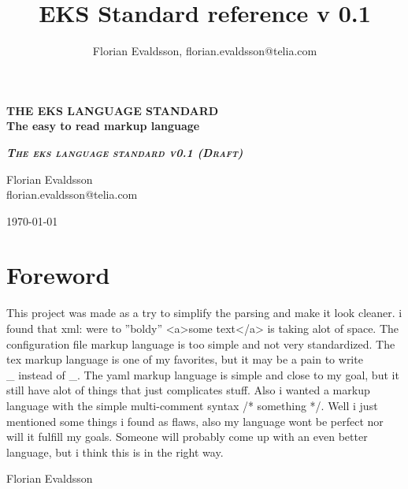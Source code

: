 \documentclass{book}
\title{\textbf{EKS Standard reference v 0.1}}
\author{Florian Evaldsson, florian.evaldsson@telia.com}
\begin{document}
	
	\begin{singlespace}
	\begin{titlepage}

	\begin{center}
  

	\textbf{\MakeUppercase{The eks language standard}} \\
  
	\textbf{The easy to read markup language}

	\vfill

	{
		\Large
		\textsc{\textbf{\textit{The eks language standard v0.1 (Draft)}}}
		\normalsize
	}

	\vfill

	Florian Evaldsson \\ florian.evaldsson@telia.com

	\end{center}

	\end{titlepage}
	\end{singlespace}
	
	\begin{singlespace}
	{\raggedleft{}\today} \\

	\section*{Foreword}

	This project was made as a try to simplify the parsing and make it look cleaner.
	i found that xml: were to ''boldy'' <a>some text</a> is taking alot of space. The configuration file markup language is too simple and not very standardized. 
	The tex markup language is one of my favorites, but it may be a pain to write \\\_ instead of \_. 
	The yaml markup language is simple and close to my goal, but it still have alot of things that just complicates stuff. Also i wanted a markup language with the simple multi-comment syntax /* something */.
	Well i just mentioned some things i found as flaws, also my language wont be perfect nor will it fulfill my goals. Someone will probably come up with an even better language, but i think this is in the right way.
	
	\vspace{1em}
	{\raggedleft{}Florian Evaldsson}
	\end{singlespace}
	\newpage
	
\end{document}
